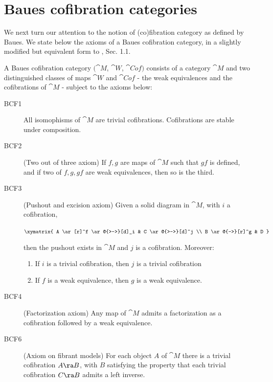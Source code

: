 \section{Baues cofibration categories}
We next turn our attention to the notion of (co)fibration category as defined by Baues. We state below the axioms of a Baues cofibration category, in a slightly modified but equivalent form to \cite{Baues1}, Sec. 1.1.

\begin{defn}
\label{defn:bauescofcat}
A Baues cofibration category $({\cat M}$, ${\cat W}$, ${\cat Cof})$ consists of a category ${\cat M}$ and two distinguished classes of maps ${\cat W}$ and ${\cat Cof}$ - the weak equivalences and the cofibrations of ${\cat M}$ - subject to the axioms below:
\begin{description}
\item[BCF1] 
All isomophisms of ${\cat M}$ are trivial cofibrations. Cofibrations are stable under composition. 
\item[BCF2] 
(Two out of three axiom) If $f, g$ are maps of ${\cat M}$ such that $gf$ is defined, and if two of $f, g, gf$ are weak equivalences, then so is the third.
\item[BCF3] 
(Pushout and excision axiom) Given a solid diagram in ${\cat M}$, with $i$ a cofibration,
\begin{center}
$ \xymatrix {
	A \ar[r]^f \ar@{>->}[d]_i &
	C \ar@{>-->}[d]^j \\
	B \ar@{-->}[r]^g &
	D
	}$
\end{center}
then the pushout exists in ${\cat M}$ and $j$ is a cofibration. Moreover:
\begin{enumerate}
\item[(a)]
If $i$ is a trivial cofibration, then $j$ is a trivial cofibration
\item[(b)]
If $f$ is a weak equivalence, then $g$ is a weak equivalence.
\end{enumerate}
\item[BCF4]
(Factorization axiom) Any map of ${\cat M}$ admits a factorization as a cofibration followed by a weak equivalence.
\item[BCF6]
(Axiom on fibrant models) For each object $A$ of ${\cat M}$ there is a trivial cofibration $A \ra B$, with $B$ satisfying the property that each trivial cofibration $C \ra B$ admits a left inverse.
\end{description}
\end{defn}

